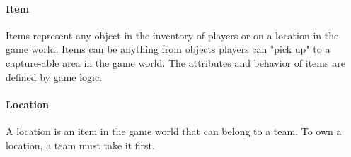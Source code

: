 \paragraph{Item}
Items represent any object in the inventory of players or on a location in the game world. Items can be anything from objects players can "pick up" to a capture-able area in the game world. The attributes and behavior of items are defined by game logic.

\paragraph{Location}
A location is an item in the game world that can belong to a team. To own a location, a team must take it first.



